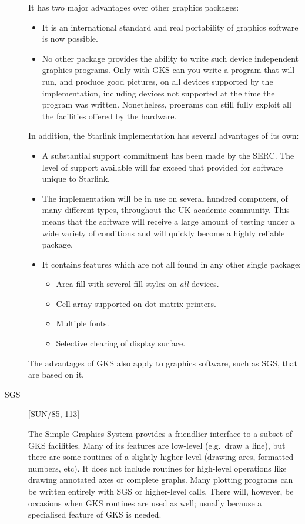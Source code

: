 \begin{description}
It has two major advantages over other graphics packages:
\begin{itemize}                   
\item It is an international standard and real portability of graphics software
 is now possible.
\item No other package provides the ability to write such device independent
 graphics programs.
 Only with GKS can you write a program that will run, and produce good pictures,
 on all devices supported by the implementation, including devices not supported
 at the time the program was written.
 Nonetheless, programs can still fully exploit all the facilities offered by the
 hardware.
\end{itemize}
In addition, the Starlink implementation has several advantages of its own:
\begin{itemize}
\item A substantial support commitment has been made by the SERC.
The level of support available will far exceed that provided for software unique
to Starlink.
\item The implementation will be in use on several hundred computers, of many
different types, throughout the UK academic community.
This means that the software will receive a large amount of testing under a wide
variety of conditions and will quickly become a highly reliable package.
\item It contains features which are not all found in any other single package:
\begin{itemize}
\item Area fill with several fill styles on {\em all} devices.
\item Cell array supported on dot matrix printers.
\item Multiple fonts.
\item Selective clearing of display surface.
\end{itemize}
\end{itemize}
The advantages of GKS also apply to graphics software, such as SGS, that are
based on it.

\item [SGS] \hfill [SUN/85, 113]

The Simple Graphics System provides a friendlier interface to a subset of GKS
facilities.
Many of its features are low-level (e.g.\ draw a line), but there are some
routines of a slightly higher level (drawing arcs, formatted numbers, etc). 
It does not include routines for high-level operations like drawing annotated
axes or complete graphs.
Many plotting programs can be written entirely with SGS or higher-level calls.
There will, however, be occasions when GKS routines are used as well; usually
because a specialised feature of GKS is needed.


\end{description}
